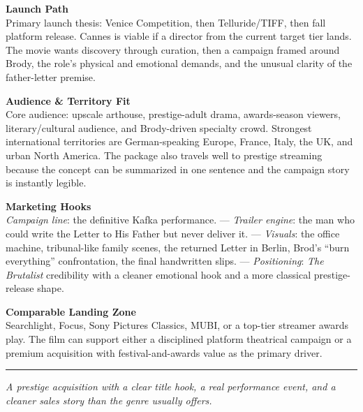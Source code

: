 \documentclass[11pt,letterpaper]{article}
\begin{document}
\textbf{Launch Path}\\
Primary launch thesis: Venice Competition, then Telluride/TIFF, then fall platform release. Cannes is viable if a director from the current target tier lands. The movie wants discovery through curation, then a campaign framed around Brody, the role's physical and emotional demands, and the unusual clarity of the father-letter premise.

\vspace{2pt}

\textbf{Audience \& Territory Fit}\\
Core audience: upscale arthouse, prestige-adult drama, awards-season viewers, literary/cultural audience, and Brody-driven specialty crowd. Strongest international territories are German-speaking Europe, France, Italy, the UK, and urban North America. The package also travels well to prestige streaming because the concept can be summarized in one sentence and the campaign story is instantly legible.

\vspace{2pt}

\textbf{Marketing Hooks}\\
\textit{Campaign line}: the definitive Kafka performance. --- \textit{Trailer engine}: the man who could write the Letter to His Father but never deliver it. --- \textit{Visuals}: the office machine, tribunal-like family scenes, the returned Letter in Berlin, Brod's ``burn everything'' confrontation, the final handwritten slips. --- \textit{Positioning}: \textit{The Brutalist} credibility with a cleaner emotional hook and a more classical prestige-release shape.

\vspace{2pt}

\textbf{Comparable Landing Zone}\\
Searchlight, Focus, Sony Pictures Classics, MUBI, or a top-tier streamer awards play. The film can support either a disciplined platform theatrical campaign or a premium acquisition with festival-and-awards value as the primary driver.

\vspace{4pt}
\textcolor{sectionrule}{\rule{\textwidth}{0.5pt}}
\vspace{2pt}
\begin{center}
{\small\color{kafkalight}\textit{A prestige acquisition with a clear title hook, a real performance event, and a cleaner sales story than the genre usually offers.}}
\end{center}
\end{document}
